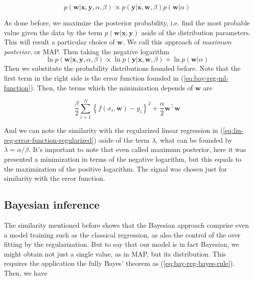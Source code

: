 \documentclass[11pt]{article} %
\begin{document}
\begin{equation}
   p(\mathbf{w} | \mathbf{x}, \mathbf{y}, \alpha, \beta) \propto p(\mathbf{y} | \mathbf{x}, \mathbf{w}, \beta) p(\mathbf{w} | \alpha)
\end{equation}

As done before, we maximize the posterior probability, i.e. find the most probable value given the data by the term $p(\mathbf{w} | \mathbf{x}, \mathbf{y}) $ aside of the distribution parameters. This will result a particular choice of $\mathbf{w}$. We call this approach of \textit{maximum posterior}, or MAP. Then taking the negative logarithm
%
\begin{equation}
   \ln p(\mathbf{w} | \mathbf{x}, \mathbf{y}, \alpha, \beta) \propto \ln p(\mathbf{y} | \mathbf{x}, \mathbf{w}, \beta) + \ln p(\mathbf{w} | \alpha)
\end{equation}
%
Then we substitute the probability distributions founded before. Note that the first term in the right side is the error function founded in (\ref{eq:bay-reg-ml-function}). Then, the terms which the minimization depends of $\mathbf{w}$ are

\begin{equation}
    \frac{\beta}{2} \sum_{i=1}^{N}\left\{f\left(x_{i}, \mathbf{w}\right)-y_{i}\right\}^{2} + \frac{\alpha}{2} \mathbf{w}^\top \mathbf{w}
\end{equation}

And we can note the similarity with the regularized linear regression in (\ref{eq:lin-reg-error-function-regularized}) aside of the term $\lambda$, what can be founded by $\lambda=\alpha / \beta$. It's important to note that even called maximum posterior, here it was presented a minimization in terms of the negative logarithm, but this equals to the maximization of the positive logarithm. The signal was chosen just for similarity with the error function.

\subsection{Bayesian inference}

The similarity mentioned before shows that the Bayesian approach comprise even a model training such as the classical regression, as also the control of the over fitting by the regularization. But to say that our model is in fact Bayesian, we might obtain not just a single value, as in MAP, but its distribution. This requires the application the fully Bayes' theorem as (\ref{eq:bay-reg-bayes-rule}). Then, we have
\end{document}
